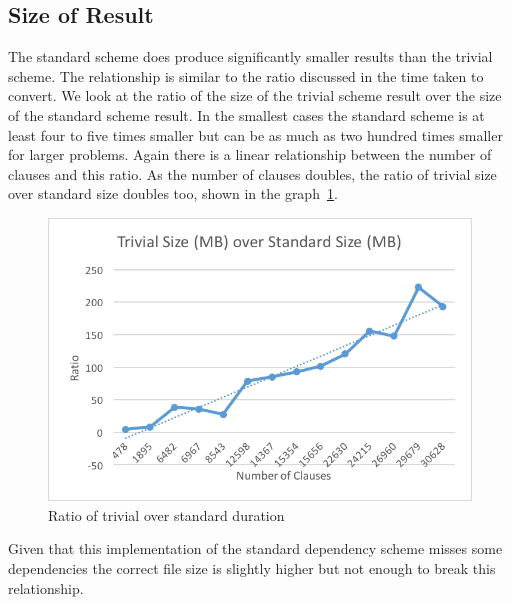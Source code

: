 \subsection{Size of Result}
The standard scheme does produce significantly smaller results than the trivial scheme. The relationship is similar to the ratio discussed in the time taken to convert. We look at the ratio of the size of the trivial scheme result over the size of the standard scheme result. In the smallest cases the standard scheme is at least four to five times smaller but can be as much as two hundred times smaller for larger problems. Again there is a linear relationship between the number of clauses and this ratio. As the number of clauses doubles, the ratio of trivial size over standard size doubles too, shown in the graph~\ref{trivialsizeoverstandardsize}.

\begin{figure}[h]
\caption{Ratio of trivial over standard duration}
\label{trivialsizeoverstandardsize}
\begin{CenteredBox}
\includegraphics{trivialsizeoverstandardsize.png}
\end{CenteredBox}
\end{figure}

Given that this implementation of the standard dependency scheme misses some dependencies the correct file size is slightly higher but not enough to break this relationship.

